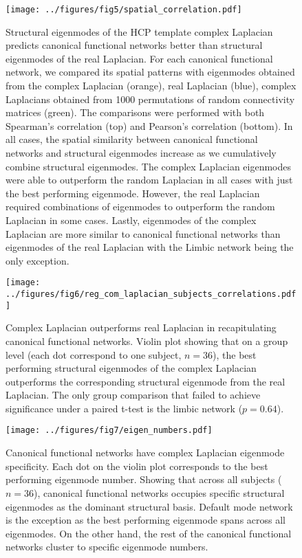 \documentclass{article}
\begin{document}
\begin{figure}[ht]
\centering
\texttt{[image: ../figures/fig5/spatial\_correlation.pdf]}
\caption{Structural eigenmodes of the HCP template complex Laplacian predicts canonical functional networks better than structural eigenmodes of the real Laplacian. For each canonical functional network, we compared its spatial patterns with eigenmodes obtained from the complex Laplacian (orange), real Laplacian (blue), complex Laplacians obtained from 1000 permutations of random connectivity matrices (green). The comparisons were performed with both Spearman's correlation (top) and Pearson's correlation (bottom). In all cases, the spatial similarity between canonical functional networks and structural eigenmodes increase as we cumulatively combine structural eigenmodes. The complex Laplacian eigenmodes were able to outperform the random Laplacian in all cases with just the best performing eigenmode. However, the real Laplacian required combinations of eigenmodes to outperform the random Laplacian in some cases. Lastly, eigenmodes of the complex Laplacian are more similar to canonical functional networks than eigenmodes of the real Laplacian with the Limbic network being the only exception.}
\label{fig:fig5}
\end{figure}

\begin{figure}[ht]
\centering
\texttt{[image: ../figures/fig6/reg\_com\_laplacian\_subjects\_correlations.pdf]}
\caption{Complex Laplacian outperforms real Laplacian in recapitulating canonical functional networks. Violin plot showing that on a group level (each dot correspond to one subject, $n = 36$), the best performing structural eigenmodes of the complex Laplacian outperforms the corresponding structural eigenmode from the real Laplacian. The only group comparison that failed to achieve significance under a paired t-test is the limbic network ($p = 0.64$).}
\label{fig:fig6}
\end{figure}


\begin{figure}[ht]
\texttt{[image: ../figures/fig7/eigen\_numbers.pdf]}
\caption{Canonical functional networks have complex Laplacian eigenmode specificity. Each dot on the violin plot corresponds to the best performing eigenmode number. Showing that across all subjects ($n = 36$), canonical functional networks occupies specific structural eigenmodes as the dominant structural basis. Default mode network is the exception as the best performing eigenmode spans across all eigenmodes. On the other hand, the rest of the canonical functional networks cluster to specific eigenmode numbers.}
\label{fig:fig7}
\end{figure}
\end{document}
